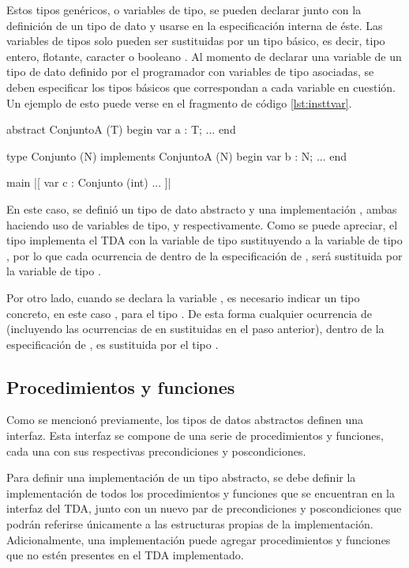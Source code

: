 {{Estos tipos genéricos, o variables de tipo, se pueden declarar junto con la
definición de un tipo de dato y usarse en la especificación interna de éste. Las
variables de tipos solo pueden ser sustituidas por un tipo básico, es decir,
tipo entero, flotante, caracter o booleano . Al momento de
declarar una variable de un tipo de dato definido por el programador con
variables de tipo asociadas, se deben  especificar los tipos básicos que
correspondan a cada variable en cuestión. Un ejemplo de esto puede verse en el
fragmento de código \ref{lst:insttvar}.

\begin{gracielacode}[caption=Ejemplo de instanciación de variables de tipo, label=lst:insttvar]
abstract ConjuntoA (T) begin
  var a : T;
  ...
end

type Conjunto (N) implements ConjuntoA (N) begin
  var b : N;
  ...
end

main
 |[ var c : Conjunto (int)
    ...
 ]|
\end{gracielacode}

En este caso, se definió un tipo de dato abstracto  y una
implementación , ambas haciendo uso de variables de tipo,
 y  respectivamente. Como se puede apreciar, el tipo
 implementa el TDA  con la variable de tipo
 sustituyendo a la variable de tipo , por lo que cada
ocurrencia de  dentro de la especificación de , será
sustituida por la variable de tipo .

Por otro lado, cuando se declara la variable , es necesario indicar un
tipo concreto, en este caso , para el tipo . De
esta forma cualquier ocurrencia de  (incluyendo las ocurrencias de
 en  sustituidas en el paso anterior), dentro de la
especificación de , es sustituida por el tipo .

\subsection{Procedimientos y funciones}

Como se mencionó previamente, los tipos de datos abstractos definen una
interfaz. Esta interfaz se compone de una serie de procedimientos y funciones,
cada una con sus respectivas precondiciones y poscondiciones.

Para definir una implementación de un tipo abstracto, se debe definir la
implementación de todos los procedimientos y funciones que se encuentran en la
interfaz del TDA, junto con un nuevo par de precondiciones y poscondiciones que
podrán referirse únicamente a las estructuras propias de la implementación.
Adicionalmente, una implementación puede agregar procedimientos y funciones que
no estén presentes en el TDA implementado.

}}
